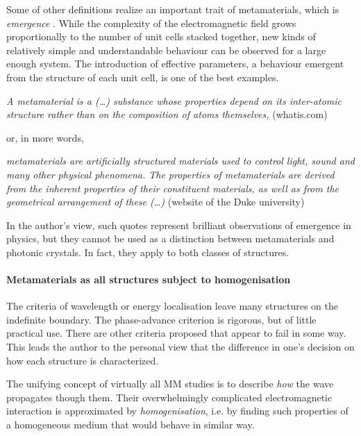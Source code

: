 Some of other definitions realize an important trait of metamaterials, which is \textit{emergence} \cite{sihvola2002electromagnetic}. While the complexity of the electromagnetic field grows proportionally to the number of unit cells stacked together, new kinds of relatively simple and understandable behaviour can be observed for a large enough system. The introduction of effective parameters, a behaviour emergent from the structure of each unit cell, is one of the best examples.
\begin{displayquote}
\textit{A metamaterial is a (\ldots) substance whose properties depend on its inter-atomic structure rather than on the composition of atoms themselves,}  (whatis.com)
\end{displayquote}
or, in more words,
\begin{displayquote}
\textit{metamaterials are artificially structured materials used to control light, sound and many other physical phenomena. The properties of metamaterials are derived from the inherent properties of their constituent materials, as well as from the geometrical arrangement of these (\ldots)}  (website of the Duke university) %
\end{displayquote}
In the author's view, such quotes represent brilliant observations of emergence in physics, but they cannot be used as a distinction between metamaterials and photonic crystals. In fact, they apply to both classes of structures.

\paragraph{Metamaterials as all structures subject to homogenisation} %
The criteria of wavelength or energy localisation leave many structures on the indefinite boundary. The phase-advance criterion is rigorous, but of little practical use. There are other criteria proposed that appear to fail in some way. This leads the author to the personal view that the difference in one's decision on how each structure is characterized. 

The unifying concept of virtually all MM studies is to describe \textit{how} the wave propagates though them. Their overwhelmingly complicated electromagnetic interaction is approximated by \textit{homogenisation}, i.e. by finding such properties of a homogeneous medium that would behave in similar way.

